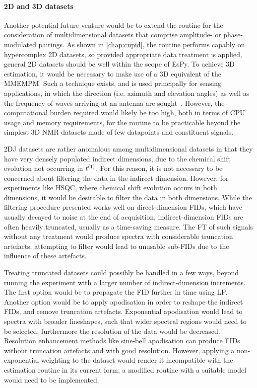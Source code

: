 \paragraph{\ac{2D} and \ac{3D} datasets}
Another potential future venture would be to extend the routine for the
consideration of multidimensional datasets that comprise amplitude- or
phase-modulated pairings.
As shown in \cref{chap:cupid}, the routine performs capably on
hypercomplex \ac{2D} datasets, so provided appropriate data treatment is
applied, general \ac{2D} datasets should be well within the scope of
\ac{EsPy}.
To achieve \ac{3D} estimation, it would be necessary to
make use of a \ac{3D} equivalent of the \ac{MMEMPM}. Such a technique exists,
and is used principally for sensing applications, in which the direction (i.e.
azimuth and elevation angles) as well as the frequency of waves arriving at an
antenna are sought~\cite{Yilmazer2006}.
However, the computational burden required would likely be too high, both
in terms of \ac{CPU} usage and memory requirements, for the routine to be
practicable beyond the simplest \ac{3D} \ac{NMR} datasets made of few
datapoints and constituent signals.

\ac{2DJ} datasets are rather anomalous among multidimensional datasets in
that they have very densely populated indirect dimensions, due to the chemical
shift evolution not occurring in $t^{(1)}$. For this reason, it
is not necessary to be concerned about filtering the data in the indirect
dimension. However, for experiments like \ac{HSQC}, where chemical shift
evolution occurs in both dimensions, it would be desirable to filter
the data in both dimensions.
While the filtering procedure presented works well on direct-dimension
\acp{FID}, which have usually decayed to noise at the end
of acquisition, indirect-dimension \acp{FID} are often heavily truncated,
usually as a time-saving measure. The \ac{FT} of such signals without any
treatment would produce spectra with considerable truncation artefacts;
attempting to filter would lead to unusable sub-\acp{FID} due to the influence
of these artefacts.

Treating truncated datasets could possibly be handled in a few ways,
beyond running the experiment with a larger number of indirect-dimension
increments. The first option would be to propagate the \ac{FID} further in time
using \ac{LP}. Another option would be to apply apodisation in order to reshape
the indirect \acp{FID}, and remove truncation artefacts.
Exponential apodisation would lead to spectra with broader lineshapes, such
that wider spectral regions would need to be selected; furthermore the
resolution of the data would be decreased.
Resolution enhancement methods like sine-bell apodisation can
produce \acp{FID} without truncation artefacts and with good resolution.
However, applying a non-exponential weighting to the
dataset would render it incompatible with the estimation routine in its
current form; a modified routine with a suitable model would need to
be implemented.

